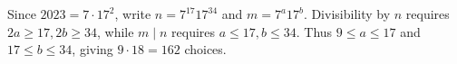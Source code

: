 Since $2023=7\cdot17^2$, write $n=7^{17}17^{34}$ and $m=7^a17^b$. Divisibility by $n$ requires $2a\ge17,2b\ge34$, while $m\mid n$ requires $a\le17,b\le34$. Thus $9\le a\le17$ and $17\le b\le34$, giving $\boxed{9\cdot18=162}$ choices.
